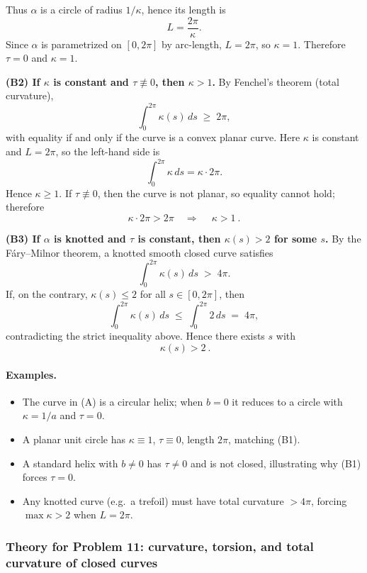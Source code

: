 \documentclass[12pt,a4paper]{article}
\theoremstyle{plain}
\theoremstyle{definition}      %
\begin{document}
	Thus $\alpha$ is a circle of radius $1/\kappa$, hence its length is
	\[
	L=\frac{2\pi}{\kappa}.
	\]
	Since $\alpha$ is parametrized on $[0,2\pi]$ by arc-length, $L=2\pi$, so $\kappa=1$.
	Therefore $\tau=0$ and $\kappa=1$.
	
	\medskip
	
	\textbf{(B2) If $\kappa$ is constant and $\tau\not\equiv 0$, then $\kappa>1$.}
	By Fenchel's theorem (total curvature),
	\[
	\int_0^{2\pi} \kappa(s)\,ds \;\ge\; 2\pi,
	\]
	with equality if and only if the curve is a convex planar curve.
	Here $\kappa$ is constant and $L=2\pi$, so the left-hand side is
	\[
	\int_0^{2\pi}\kappa\,ds = \kappa\cdot 2\pi.
	\]
	Hence $\kappa\ge 1$.
	If $\tau\not\equiv 0$, then the curve is not planar, so equality cannot hold; therefore
	\[
	\kappa\cdot 2\pi > 2\pi \quad\Rightarrow\quad \boxed{\ \kappa>1\ }.
	\]
	
	\medskip
	
	\textbf{(B3) If $\alpha$ is knotted and $\tau$ is constant, then $\kappa(s)>2$ for some $s$.}
	By the F\'ary--Milnor theorem, a knotted smooth closed curve satisfies
	\[
	\int_0^{2\pi} \kappa(s)\,ds \;>\; 4\pi.
	\]
	If, on the contrary, $\kappa(s)\le 2$ for all $s\in[0,2\pi]$, then
	\[
	\int_0^{2\pi}\kappa(s)\,ds \;\le\; \int_0^{2\pi} 2\,ds \;=\; 4\pi,
	\]
	contradicting the strict inequality above. Hence there exists $s$ with
	\[
	\boxed{\ \kappa(s)>2\ }.
	\]
	
	\paragraph{Examples.}
	\begin{itemize}
		\item The curve in (A) is a circular helix; when $b=0$ it reduces to a circle with $\kappa=1/a$ and $\tau=0$.
		\item A planar unit circle has $\kappa\equiv 1$, $\tau\equiv 0$, length $2\pi$, matching (B1).
		\item A standard helix with $b\neq 0$ has $\tau\neq 0$ and is not closed, illustrating why (B1) forces $\tau=0$.
		\item Any knotted curve (e.g.\ a trefoil) must have total curvature $>4\pi$, forcing $\max\kappa>2$ when $L=2\pi$.
	\end{itemize}
	
	\subsubsection*{Theory for Problem 11: curvature, torsion, and total curvature of closed curves}
	
\end{document}
